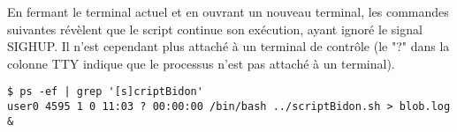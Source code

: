 En fermant le terminal actuel et en ouvrant un nouveau terminal, les commandes suivantes révèlent que le script continue son exécution, ayant ignoré le signal SIGHUP. Il n'est cependant
plus attaché à un terminal de contrôle (le "?" dans la colonne TTY indique que le processus n'est pas attaché à un terminal).

\begin{lstlisting}[style=blackstyle]
$ ps -ef | grep '[s]criptBidon'
user0 4595 1 0 11:03 ? 00:00:00 /bin/bash ../scriptBidon.sh > blob.log &
\end{lstlisting}
